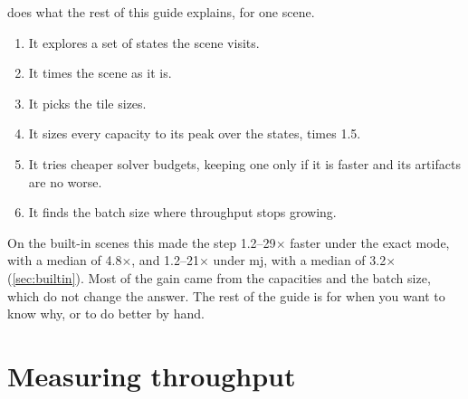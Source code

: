  does what the rest of this guide explains, for one scene.

\begin{enumerate}
\item It explores a set of states the scene visits.
\item It times the scene as it is.
\item It picks the tile sizes.
\item It sizes every capacity to its peak over the states, times 1.5.
\item It tries cheaper solver budgets, keeping one only if it is faster and its artifacts are no worse.
\item It finds the batch size where throughput stops growing.
\end{enumerate}

On the built-in scenes this made the step 1.2--29$\times$ faster under the exact mode, with a median of 4.8$\times$, and 1.2--21$\times$ under mj, with a median of 3.2$\times$ (\cref{sec:builtin}). Most of the gain came from the capacities and the batch size, which do not change the answer. The rest of the guide is for when you want to know why, or to do better by hand.

\section{Measuring throughput}\label{sec:measure}

